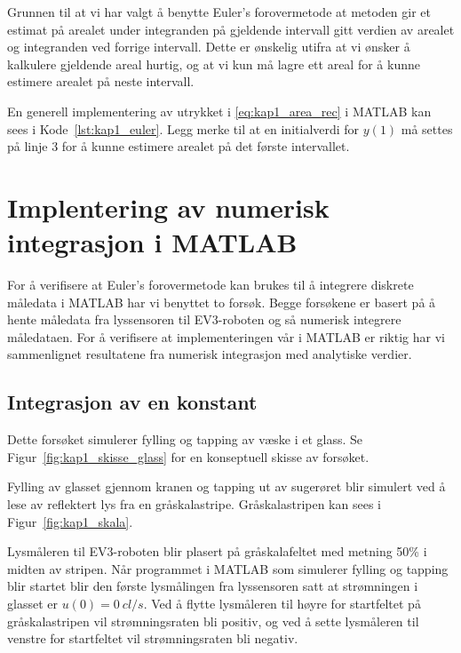 \documentclass[main.tex]{subfiles}
\begin{document}
Grunnen til at vi har valgt å benytte Euler's forovermetode at metoden gir et estimat på arealet under integranden på gjeldende intervall gitt verdien av arealet og integranden ved forrige intervall. Dette er ønskelig utifra at vi ønsker å kalkulere gjeldende areal hurtig, og at vi kun må lagre ett areal for å kunne estimere arealet på neste intervall.

En generell implementering av utrykket i \eqref{eq:kap1_area_rec} i \textsc{MATLAB} kan sees i Kode~\ref{lst:kap1_euler}. Legg merke til at en initialverdi for $y(1)$ må settes på linje 3 for å kunne estimere arealet på det første intervallet.



\section{Implentering av numerisk integrasjon i \textsc{MATLAB}}
For å verifisere at Euler's forovermetode kan brukes til å integrere diskrete måledata i \textsc{MATLAB} har vi benyttet to forsøk. Begge forsøkene er basert på å hente måledata fra lyssensoren til \textsc{EV3}-roboten og så numerisk integrere måledataen. For å verifisere at implementeringen vår i \textsc{MATLAB} er riktig har vi sammenlignet resultatene fra numerisk integrasjon med analytiske verdier.

\subsection{Integrasjon av en konstant}
Dette forsøket simulerer fylling og tapping av væske i et glass. Se Figur~\ref{fig:kap1_skisse_glass} for en konseptuell skisse av forsøket.



Fylling av glasset gjennom kranen og tapping ut av sugerøret blir simulert ved å lese av reflektert lys fra en gråskalastripe. Gråskalastripen kan sees i Figur~\ref{fig:kap1_skala}.



Lysmåleren til \textsc{EV3}-roboten blir plasert på gråskalafeltet med metning 50\% i midten av stripen. Når programmet i \textsc{MATLAB} som simulerer fylling og tapping blir startet blir den første lysmålingen fra lyssensoren satt at strømningen i glasset er $u(0) = \SI{0}{cl/s}$. Ved å flytte lysmåleren til høyre for startfeltet på gråskalastripen vil strømningsraten bli positiv, og ved å sette lysmåleren til venstre for startfeltet vil strømningsraten bli negativ.
\end{document}
